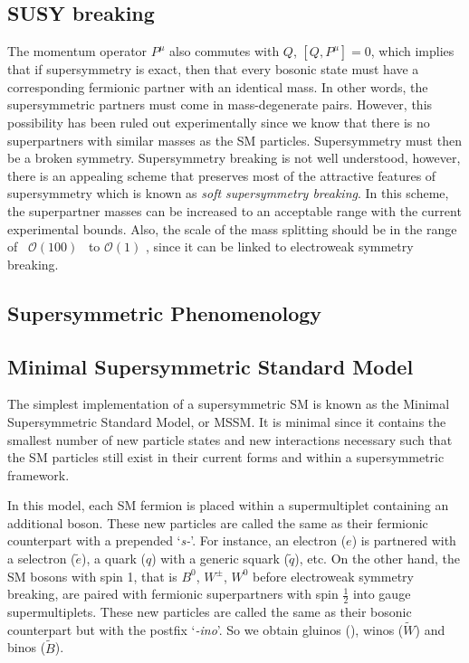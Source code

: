 \subsection*{SUSY breaking} 

The momentum operator $P^{\mu}$ also commutes with $Q$, $\left[Q,P^\mu\right]=0$, which implies that if 
supersymmetry is exact, then that every bosonic state must have a corresponding fermionic partner with 
an identical mass. In other words, the supersymmetric partners must come in mass-degenerate pairs.
However, this possibility has been ruled out experimentally since we know that there is no superpartners 
with similar masses as the SM particles. Supersymmetry must then be a broken symmetry. 
Supersymmetry breaking is not well understood, however, there is an appealing scheme that preserves 
most of the attractive features of supersymmetry which is known as \textit{soft supersymmetry breaking}.
In this scheme, the superpartner masses can be increased to an acceptable range with the current 
experimental bounds. Also, the scale of the mass splitting should be in the range of 
~$\mathcal{O}\left(100\right)$ \GeV~to $\mathcal{O}\left(1\right)$ \TeV, since it can be linked to electroweak 
symmetry breaking\cite{Chung:2003fi}. 

\subsection{Supersymmetric Phenomenology}

\subsection*{Minimal Supersymmetric Standard Model} 

The simplest implementation of a supersymmetric SM is known as the Minimal Supersymmetric Standard Model, or 
MSSM. It is minimal since it contains the smallest number of new particle states and new interactions 
necessary such that the SM particles still exist in their current forms and within a supersymmetric framework.

In this model, each SM fermion is placed within a supermultiplet containing an additional boson. 
These new particles are called the same as their fermionic counterpart with a prepended `\textit{s-}'.
For instance, an electron ($e$) is partnered with a selectron ($\tilde{e}$), a quark ($q$) with a generic 
squark ($\tilde{q}$), etc. On the other hand, the SM bosons with spin 1, that is $B^0$, $W^{\pm}$, $W^0$ before 
electroweak symmetry breaking, are paired with fermionic superpartners with spin $\frac{1}{2}$ into gauge 
supermultiplets. These new particles are called the same as their bosonic counterpart but with the postfix 
`\textit{-ino}'. So we obtain gluinos (\gluino), winos ($\tilde{W}$) and binos ($\tilde{B}$).

